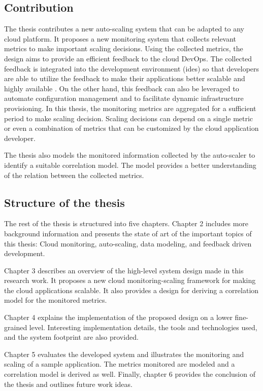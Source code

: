 \documentclass[article,type=msc,colorback,12pt,accentcolor=tud8b,table]{tudthesis}
\begin{document}
	\subsection{Contribution}	
	
	The thesis contributes a new auto-scaling system that can be adapted to any cloud platform. It proposes a new monitoring system that collects relevant metrics to make important scaling decisions. Using the collected metrics, the design aims to provide an efficient feedback to the cloud DevOps. The collected feedback is integrated into the development environment (\gls{ide}s) so that developers are able to utilize the feedback to make their applications better scalable and highly available \cite{cito2015runtime}. On the other hand, this feedback can also be leveraged to automate configuration management and to facilitate dynamic infrastructure provisioning. In this thesis, the monitoring metrics are aggregated for a sufficient period to make scaling decision. Scaling decisions can depend on a single metric or even a combination of metrics that can be customized by the cloud application developer. 
	
	The thesis also models the monitored information collected by the auto-scaler to identify a suitable correlation model. The model provides a better understanding of the relation between the collected metrics. 
	
	\subsection{Structure of the thesis}

	\par The rest of the thesis is structured into five chapters.  Chapter 2 includes more background information and presents the state of art of the important topics of this thesis: Cloud monitoring, auto-scaling, data modeling, and feedback driven development. 
	
	Chapter 3 describes an overview of the high-level system design made in this research work. It proposes a new cloud monitoring-scaling framework for making the cloud applications scalable. It also provides a design for deriving a correlation model for the monitored metrics.
	
	Chapter 4 explains the implementation of the proposed design on a lower fine-grained level. Interesting implementation details, the tools and technologies used,  and the system footprint are also provided.  
	
	Chapter 5 evaluates the developed system and illustrates the monitoring and scaling of a sample application. The metrics monitored are modeled and a correlation model is derived as well. Finally, chapter 6 provides the conclusion of the thesis and outlines future work ideas.
\end{document}
